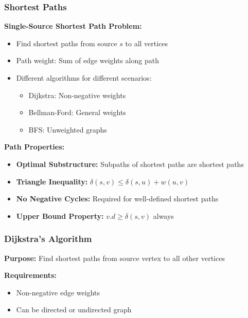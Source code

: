 \subsubsection{Shortest Paths}
\textbf{Single-Source Shortest Path Problem:}
\begin{itemize}[noitemsep]
    \item Find shortest paths from source $s$ to all vertices
    \item Path weight: Sum of edge weights along path
    \item Different algorithms for different scenarios:
        \begin{itemize}[noitemsep]
            \item Dijkstra: Non-negative weights
            \item Bellman-Ford: General weights
            \item BFS: Unweighted graphs
        \end{itemize}
\end{itemize}

\textbf{Path Properties:}
\begin{itemize}[noitemsep]
    \item \textbf{Optimal Substructure:} Subpaths of shortest paths are shortest paths
    \item \textbf{Triangle Inequality:} $\delta(s,v) \leq \delta(s,u) + w(u,v)$
    \item \textbf{No Negative Cycles:} Required for well-defined shortest paths
    \item \textbf{Upper Bound Property:} $v.d \geq \delta(s,v)$ always
\end{itemize}

\subsubsection{Dijkstra's Algorithm}
\textbf{Purpose:} Find shortest paths from source vertex to all other vertices

\textbf{Requirements:}
\begin{itemize}[noitemsep]
    \item Non-negative edge weights
    \item Can be directed or undirected graph
\end{itemize}


